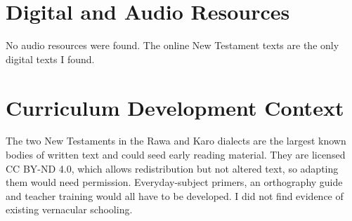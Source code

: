 \documentclass[12pt]{article}
\begin{document}
\section{Digital and Audio Resources}
No audio resources were found. The online New Testament texts are the only digital texts I found.

\section{Curriculum Development Context}
The two New Testaments in the Rawa and Karo dialects are the largest known bodies of written text and could seed early reading material. They are licensed CC BY-ND 4.0, which allows redistribution but not altered text, so adapting them would need permission. Everyday-subject primers, an orthography guide and teacher training would all have to be developed. I did not find evidence of existing vernacular schooling.
\end{document}
